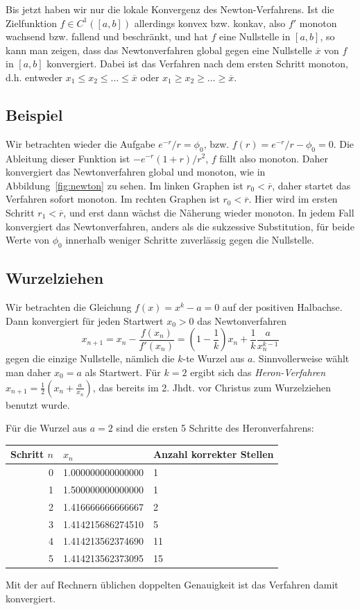 Bis jetzt haben wir nur die lokale Konvergenz des
Newton-Verfahrens. Ist die Zielfunktion $f\in C^1([a,b])$ allerdings
konvex bzw. konkav, also $f'$ monoton wachsend bzw. fallend und
beschränkt, und hat $f$ eine Nullstelle in $[a,b]$, so kann man
zeigen, dass das Newtonverfahren global gegen eine Nullstelle
$\overline{x}$ von $f$ in $[a,b]$ konvergiert. Dabei ist das Verfahren
nach dem ersten Schritt monoton, d.h. entweder $x_1\le
x_2\le\ldots\le\overline{x}$ oder $x_1\ge
x_2\ge\ldots\ge\overline{x}$.

\subsection{Beispiel}

Wir betrachten wieder die Aufgabe $e^{-r}/r = \phi_0$, bzw. $f(r) =
e^{-r}/r - \phi_0 = 0$. Die Ableitung dieser Funktion ist $-e^{-r}(1 +
r)/r^2$, $f$ fällt also monoton. Daher konvergiert das Newtonverfahren
global und monoton, wie in Abbildung~\ref{fig:newton} zu sehen. Im
linken Graphen ist $r_0<\overline{r}$, daher startet das Verfahren
sofort monoton. Im rechten Graphen ist $r_0 < \overline{r}$. Hier wird
im ersten Schritt $r_1 < \overline{r}$, und erst dann wächst die
Näherung wieder monoton. In jedem Fall konvergiert das
Newtonverfahren, anders als die sukzessive Substitution, für beide
Werte von $\phi_0$ innerhalb weniger Schritte zuverlässig gegen die
Nullstelle.

\subsection{Wurzelziehen}

Wir betrachten die Gleichung $f(x) = x^k - a = 0$ auf der positiven
Halbachse. Dann konvergiert für jeden Startwert $x_0>0$ das
Newtonverfahren
\begin{equation}
  x_{n+1} = x_n - \frac{f(x_n)}{f'(x_n)} = \left(1 -
    \frac{1}{k}\right) x_n + \frac{1}{k} \frac{a}{x_n^{k-1}}
\end{equation}
gegen die einzige Nullstelle, nämlich die $k$-te Wurzel aus
$a$. Sinnvollerweise wählt man daher $x_0=a$ als Startwert. Für $k=2$
ergibt sich das \emph{Heron-Verfahren} $x_{n+1} = \frac{1}{2}\left(x_n
  + \frac{a}{x_n}\right)$, das bereits im 2. Jhdt. vor Christus zum
Wurzelziehen benutzt wurde.

Für die Wurzel aus $a=2$ sind die ersten 5 Schritte des Heronverfahrens:
\begin{center}
  \begin{tabular}{r|l|l}
    Schritt $n$ & $x_n$ & Anzahl korrekter Stellen \\\hline
    0 & 1.000000000000000 & 1 \\
    1 & 1.500000000000000 & 1 \\
    2 & 1.416666666666667 & 2 \\
    3 & 1.414215686274510 & 5 \\
    4 & 1.414213562374690 & 11 \\ 
    5 & 1.414213562373095 & 15
  \end{tabular}
\end{center}
Mit der auf Rechnern üblichen doppelten Genauigkeit ist das Verfahren
damit konvergiert.

